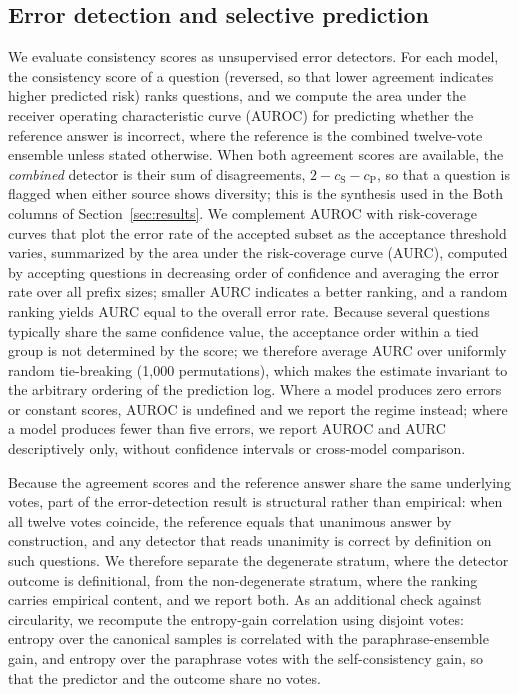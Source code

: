 \subsection{Error detection and selective prediction}

We evaluate consistency scores as unsupervised error detectors. For each model, the consistency score of a question (reversed, so that lower agreement indicates higher predicted risk) ranks questions, and we compute the area under the receiver operating characteristic curve (AUROC) for predicting whether the reference answer is incorrect, where the reference is the combined twelve-vote ensemble unless stated otherwise. When both agreement scores are available, the \emph{combined} detector is their sum of disagreements, $2 - c_{\mathrm{S}} - c_{\mathrm{P}}$, so that a question is flagged when either source shows diversity; this is the synthesis used in the Both columns of Section~\ref{sec:results}. We complement AUROC with risk-coverage curves that plot the error rate of the accepted subset as the acceptance threshold varies, summarized by the area under the risk-coverage curve (AURC), computed by accepting questions in decreasing order of confidence and averaging the error rate over all prefix sizes; smaller AURC indicates a better ranking, and a random ranking yields AURC equal to the overall error rate. Because several questions typically share the same confidence value, the acceptance order within a tied group is not determined by the score; we therefore average AURC over uniformly random tie-breaking (1{,}000 permutations), which makes the estimate invariant to the arbitrary ordering of the prediction log. Where a model produces zero errors or constant scores, AUROC is undefined and we report the regime instead; where a model produces fewer than five errors, we report AUROC and AURC descriptively only, without confidence intervals or cross-model comparison.

Because the agreement scores and the reference answer share the same underlying votes, part of the error-detection result is structural rather than empirical: when all twelve votes coincide, the reference equals that unanimous answer by construction, and any detector that reads unanimity is correct by definition on such questions. We therefore separate the degenerate stratum, where the detector outcome is definitional, from the non-degenerate stratum, where the ranking carries empirical content, and we report both. As an additional check against circularity, we recompute the entropy-gain correlation using disjoint votes: entropy over the canonical samples is correlated with the paraphrase-ensemble gain, and entropy over the paraphrase votes with the self-consistency gain, so that the predictor and the outcome share no votes.

